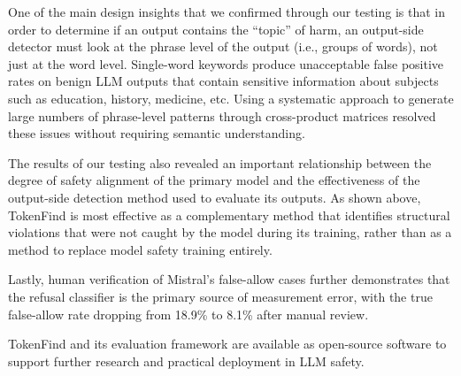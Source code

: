 \documentclass[11pt]{article}
\begin{document}
One of the main design insights that we confirmed through our testing is that in order to
determine if an output contains the ``topic'' of harm, an output-side detector must look at the
phrase level of the output (i.e., groups of words), not just at the word level. Single-word keywords
produce unacceptable false positive rates on benign LLM outputs that contain sensitive information
about subjects such as education, history, medicine, etc. Using a systematic approach to generate
large numbers of phrase-level patterns through cross-product matrices resolved these issues without
requiring semantic understanding.

The results of our testing also revealed an important relationship between the degree of safety
alignment of the primary model and the effectiveness of the output-side detection method used to
evaluate its outputs. As shown above, TokenFind is most effective as a complementary method
that identifies structural violations that were not caught by the model during its training, rather
than as a method to replace model safety training entirely.

Lastly, human verification of Mistral's false-allow cases further demonstrates that the refusal
classifier is the primary source of measurement error, with the true false-allow rate dropping from
18.9\% to 8.1\% after manual review.

TokenFind and its evaluation framework are available as open-source software to support further
research and practical deployment in LLM safety.



\end{document}
